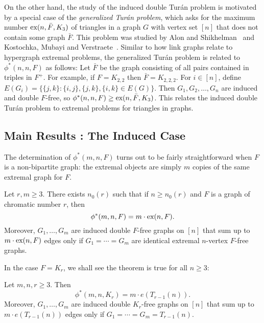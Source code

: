 On the other hand, the study of the induced double Tur\'{a}n problem is motivated by a special case of the \textit{generalized Tur\'{a}n problem}, which asks for the maximum number $\textnormal{ex}(n, \bar{F}, K_3)$ of triangles in a graph $G$ with vertex set $[n]$ that does not contain some graph $\bar{F}$. This problem was studied by Alon and Shikhelman~\cite{AlonShikhelman2016} and Kostochka, Mubayi and Verstraete~\cite{KostochkaMubayiV2015, MubayiMukherjee2023, MubayiV2016}. Similar to how link graphs relate to hypergraph extremal problems, the generalized Tur\'{a}n problem is related to $\phi^*(n, n, F)$ as follows: Let $\bar{F}$ be the graph consisting of all pairs contained in triples in $F^+$. For example, if $F = K_{2,2}$ then $\bar{F} = K_{2,2,2}$. For $i \in [n]$, define $E(G_i) = \{\{j, k\} : \{i, j\}, \{j, k\}, \{i, k\} \in E(G)\}$. Then $G_1, G_2, \dots, G_n$ are induced and double $F$-free, so $\phi^*(n, n, F) \geq \textnormal{ex}(n, \bar{F}, K_3)$. This relates the induced double Tur\'{a}n problem to extremal problems for triangles in graphs.

\subsection{Main Results : The Induced Case}

The determination of $\phi^*(m, n, F)$ turns out to be fairly straightforward when $F$ is a non-bipartite graph: the extremal objects are simply $m$ copies of the same extremal graph for $F$.

\begin{theorem}\label{thm:inducedF}
  Let $r, m \geq 3$. There exists $n_0(r)$ such that if $n \geq n_0(r)$ and $F$ is a graph of chromatic number $r$, then
  \[
    \phi^*(m, n, F) = m \cdot \textnormal{ex}(n, F).
  \]
  Moreover, $G_1, \ldots, G_m$ are induced double $F$-free graphs on $[n]$ that sum up to $m \cdot \textnormal{ex}(n, F)$ edges only if $G_1 = \cdots = G_m$ are identical extremal $n$-vertex $F$-free graphs.
\end{theorem}

In the case $F = K_r$, we shall see the theorem is true for all $n \geq 3$:

\begin{theorem}\label{thm:complete}
  Let $m, n, r \geq 3$. Then 
  \[
    \phi^*(m, n, K_{r}) = m \cdot e(T_{r - 1}(n)).
  \]
  Moreover, $G_1, \ldots, G_m$ are induced double $K_r$-free graphs on $[n]$ that sum up to $m \cdot e(T_{r - 1}(n))$ edges only if $G_1 = \cdots = G_m = T_{r - 1}(n)$.
\end{theorem}

